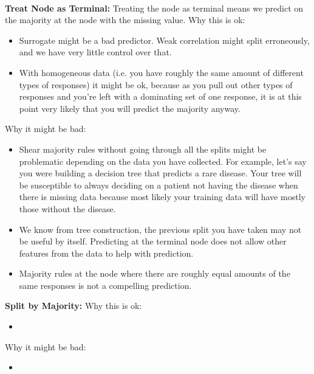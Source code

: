 \documentclass[11pt]{article}
\begin{document}
\begin{center}

\ \\
\end{center}


\vspace{5 mm}
\noindent
{\bf Treat Node as Terminal:} Treating the node as terminal means we predict on 
the majority at the node with the missing value. Why this is ok:

\begin{itemize}
\item Surrogate might be a bad predictor. Weak correlation might split 
erroneously, and we have very little control over that.
\item With homogeneous data (i.e. you have roughly the same amount of different 
types of responses) it might be ok, because as you pull out other types of 
responses and you're left with a dominating set of one response, it is at this 
point very likely that you will predict the majority anyway.
\end{itemize}

Why it might be bad:

\begin{itemize}
\item Shear majority rules without going through all the splits might be 
problematic depending on the data you have collected. For example, let's say 
you were building a decision tree that predicts a rare disease. Your tree will 
be susceptible to always deciding on a patient not having the disease when 
there is missing data because most likely your training data will have mostly 
those without the disease.
\item We know from tree construction, the previous split you have taken may not 
be useful by itself. Predicting at the terminal node does not allow other 
features from the data to help with prediction.
\item Majority rules at the node where there are roughly equal amounts of the 
same responses is not a compelling prediction.
\end{itemize}

{\bf Split by Majority:} Why this is ok:

\begin{itemize}
\item 
\end{itemize}

Why it might be bad:

\begin{itemize}
\item 
\end{itemize}
\end{document}
